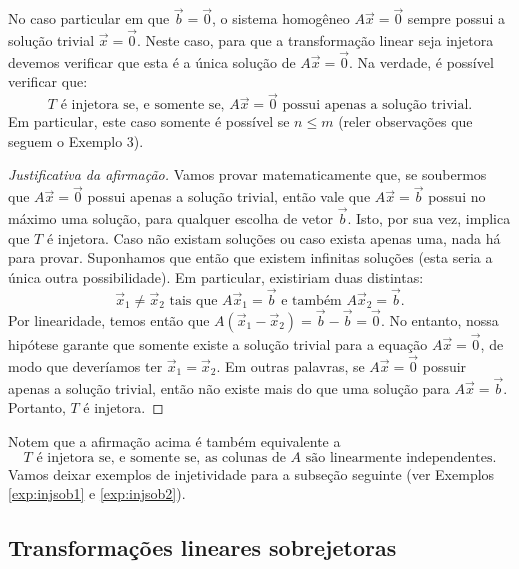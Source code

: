 \documentclass[../livro.tex]{subfiles}
\begin{document}
No caso particular em que $\vec{b} = \vec{0}$, o sistema homogêneo $A\vec{x} = \vec{0}$ sempre possui a solução trivial $\vec{x} = \vec{0}$. Neste caso, para que a transformação linear seja injetora devemos verificar que esta é a única solução de $A\vec{x} = \vec{0}$. Na verdade, é possível verificar que:
\begin{equation}
\boxed{\text{$T$ é injetora se, e somente se, $A\vec{x} = \vec{0}$ possui apenas a solução trivial.}}
\end{equation} Em particular, este caso somente é possível se $n \le m$ (reler observações que seguem o Exemplo 3).

\begin{proof}[Justificativa da afirmação]
Vamos provar matematicamente que, se soubermos que $A\vec{x} = \vec{0}$ possui apenas a solução trivial, então vale que $A\vec{x} = \vec{b}$ possui no máximo uma solução, para qualquer escolha de vetor $\vec{b}$. Isto, por sua vez, implica que $T$ é injetora. Caso não existam soluções ou caso exista apenas uma, nada há para provar. Suponhamos que então que existem infinitas soluções (esta seria a única outra possibilidade). Em particular, existiriam duas distintas:
\begin{equation}
\vec{x}_1 \neq \vec{x}_2 \text{ tais que } A \vec{x}_1 = \vec{b} \text{ e também } A \vec{x}_2 = \vec{b}.
\end{equation} Por linearidade, temos então que $A (\vec{x}_1 - \vec{x}_2) = \vec{b} - \vec{b} = \vec{0}$. No entanto, nossa hipótese garante que somente existe a solução trivial para a equação $A\vec{x} = \vec{0}$, de modo que deveríamos ter $\vec{x}_1 = \vec{x}_2$. Em outras palavras, se $A\vec{x} = \vec{0}$ possuir apenas a solução trivial, então não existe mais do que uma solução para $A\vec{x} = \vec{b}$. Portanto, $T$ é injetora.
\end{proof}

Notem que a afirmação acima é também equivalente a
\begin{equation}
\boxed{\text{$T$ é injetora se, e somente se, as colunas de $A$ são linearmente independentes.}}
\end{equation} Vamos deixar exemplos de injetividade para a subseção seguinte (ver Exemplos \ref{exp:injsob1} e \ref{exp:injsob2}).


\subsection{Transformações lineares sobrejetoras}
\end{document}
